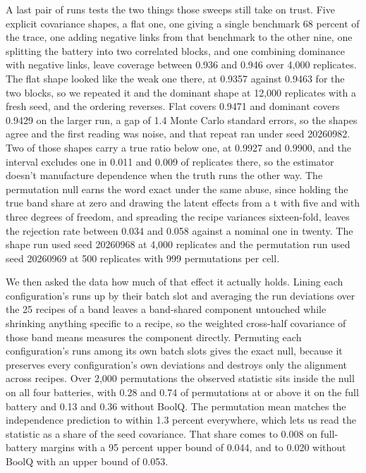 A last pair of runs tests the two things those sweeps still take on trust. Five explicit covariance shapes, a flat one, one giving a single benchmark 68 percent of the trace, one adding negative links from that benchmark to the other nine, one splitting the battery into two correlated blocks, and one combining dominance with negative links, leave coverage between 0.936 and 0.946 over 4,000 replicates. The flat shape looked like the weak one there, at 0.9357 against 0.9463 for the two blocks, so we repeated it and the dominant shape at 12,000 replicates with a fresh seed, and the ordering reverses. Flat covers 0.9471 and dominant covers 0.9429 on the larger run, a gap of 1.4 Monte Carlo standard errors, so the shapes agree and the first reading was noise, and that repeat ran under seed 20260982. Two of those shapes carry a true ratio below one, at 0.9927 and 0.9900, and the interval excludes one in 0.011 and 0.009 of replicates there, so the estimator doesn't manufacture dependence when the truth runs the other way. The permutation null earns the word exact under the same abuse, since holding the true band share at zero and drawing the latent effects from a t with five and with three degrees of freedom, and spreading the recipe variances sixteen-fold, leaves the rejection rate between 0.034 and 0.058 against a nominal one in twenty. The shape run used seed 20260968 at 4,000 replicates and the permutation run used seed 20260969 at 500 replicates with 999 permutations per cell.

We then asked the data how much of that effect it actually holds. Lining each configuration's runs up by their batch slot and averaging the run deviations over the 25 recipes of a band leaves a band-shared component untouched while shrinking anything specific to a recipe, so the weighted cross-half covariance of those band means measures the component directly. Permuting each configuration's runs among its own batch slots gives the exact null, because it preserves every configuration's own deviations and destroys only the alignment across recipes. Over 2,000 permutations the observed statistic sits inside the null on all four batteries, with 0.28 and 0.74 of permutations at or above it on the full battery and 0.13 and 0.36 without BoolQ. The permutation mean matches the independence prediction to within 1.3 percent everywhere, which lets us read the statistic as a share of the seed covariance. That share comes to 0.008 on full-battery margins with a 95 percent upper bound of 0.044, and to 0.020 without BoolQ with an upper bound of 0.053.

